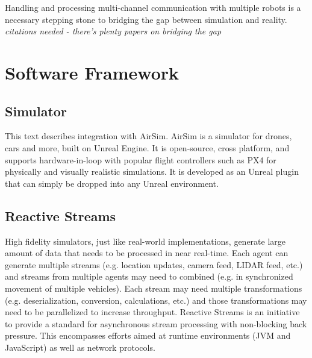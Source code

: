 \documentclass{article}
\begin{document}
Handling and processing multi-channel communication with multiple robots is a necessary stepping stone to bridging the gap between simulation and reality. \emph{citations needed - there's plenty papers on bridging the gap}




\section{Software Framework}

\subsection{Simulator}
This text describes integration with AirSim. AirSim is a simulator for drones, cars and more, built on Unreal Engine. It is open-source, cross platform, and supports hardware-in-loop with popular flight controllers such as PX4 for physically and visually realistic simulations. It is developed as an Unreal plugin that can simply be dropped into any Unreal environment. \cite{shah2018airsim}




\subsection{Reactive Streams}


High fidelity simulators, just like real-world implementations, generate large amount of data that needs to be processed in near real-time. Each agent can generate multiple streams (e.g. location updates, camera feed, LIDAR feed, etc.) and streams from multiple agents may need to combined (e.g. in synchronized movement of multiple vehicles). Each stream may need multiple transformations (e.g. deserialization, conversion, calculations, etc.) and those transformations may need to be parallelized to increase throughput.
Reactive Streams is an initiative to provide a standard for asynchronous stream processing with non-blocking back pressure. This encompasses efforts aimed at runtime environments (JVM and JavaScript) as well as network protocols. \cite{reactive-manifesto} 
\end{document}
